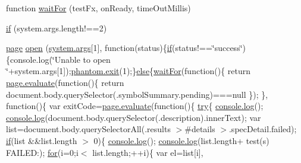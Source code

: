 \begin{DoxyCompactItemize}
\item 
function \hyperlink{run-jasmine_8js_a92050644a3b06d4b107af3a767f370b1}{wait\+For} (test\+Fx, on\+Ready, time\+Out\+Millis)
\item 
\hyperlink{run-jasmine_8js_a257c1144ed4804cfc7074491c5f634f2}{if} (system.\+args.\+length!==2)
\item 
\hyperlink{waitfor_8js_a85d8b1b97106b359e1c9ee119ebe5832}{page} \hyperlink{run-jasmine_8js_a855997306ec473484bd1e0b86606f9b6}{open} (\hyperlink{responsive-screenshot_8js_a64e5c861448a80a00f5c93e96de17d7a}{system.\+args}\mbox{[}1\mbox{]}, function(status)\{\hyperlink{sleepsort_8js_a41bc2f4fa2f08e1e174987b1c09445c1}{if}(status!==\char`\"{}success\char`\"{})\{console.\+log(\char`\"{}Unable to open \char`\"{}+system.\+args\mbox{[}1\mbox{]});\hyperlink{version_8js_a01fca00da67a8c60470b440fa7083bf7}{phantom.\+exit}(1);\}\hyperlink{sleepsort_8js_a0544c3fe466e421738dae463968b70ba}{else}\{\hyperlink{waitfor_8js_a92050644a3b06d4b107af3a767f370b1}{wait\+For}(function()\{                                       return \hyperlink{pagecallback_8js_a63376e151867d7c68f635e19817b9302}{page.\+evaluate}(function()\{                                                       return document.\+body.\+query\+Selector(\textquotesingle{}.symbol\+Summary.\+pending\textquotesingle{})===null                                       \});                       \}, function()\{                                       var exit\+Code=\hyperlink{pagecallback_8js_a63376e151867d7c68f635e19817b9302}{page.\+evaluate}(function()\{                                                       \hyperlink{echo_to_file_8js_abe4cc9788f52e49485473dc699537388}{try}\{                                                                       \hyperlink{version_8js_a8805635a2f9bf454129d95456a5d317a}{console.\+log}(\textquotesingle{}\textquotesingle{});                                                                       \hyperlink{version_8js_a8805635a2f9bf454129d95456a5d317a}{console.\+log}(document.\+body.\+query\+Selector(\textquotesingle{}.description\textquotesingle{}).inner\+Text);                                                                       var list=document.\+body.\+query\+Selector\+All(\textquotesingle{}.results $>$\#details $>$.spec\+Detail.\+failed\textquotesingle{});                                                                       \hyperlink{sleepsort_8js_a41bc2f4fa2f08e1e174987b1c09445c1}{if}(list \&\&list.\+length $>$ 0)\{                                                                               \hyperlink{version_8js_a8805635a2f9bf454129d95456a5d317a}{console.\+log}(\textquotesingle{}\textquotesingle{});                                                                               \hyperlink{version_8js_a8805635a2f9bf454129d95456a5d317a}{console.\+log}(list.\+length+ \textquotesingle{}test(s) F\+A\+I\+L\+E\+D\+:\textquotesingle{});                                                                               \hyperlink{printenv_8js_adf395edc207d098e5ade0b3bbab78f37}{for}(i=0;i$<$ list.\+length;++i)\{                                                                                               var el=list\mbox{[}i\mbox{]},                           
\end{DoxyCompactItemize}
